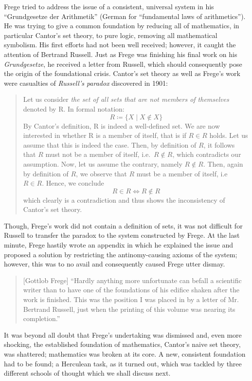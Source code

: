 \documentclass[hidelinks]{article}
\theoremstyle{plain}
\theoremstyle{definition}
\theoremstyle{rem}
\begin{document}
Frege tried to address the issue of a consistent, universal system in his ``Grundgesetze der Arithmetik'' (German for ``fundamental laws of arithmetics''). He was trying to give a common foundation by reducing all of mathematics, in particular Cantor's set theory, to pure logic, removing all mathematical symbolism. His first efforts had not been well received; however, it caught the attention of Bertrand Russell. Just as Frege was finishing his final work on his \textit{Grundgesetze}, he received a letter from Russell, which should consequently pose the origin of the foundational crisis. Cantor's set theory as well as Frege's work were casualties of \textit{Russell's paradox} discovered in 1901:
\begin{quote}
Let us consider \textit{the set of all sets that are not members of themselves} denoted by R. In formal notation:
\begin{equation*}
	R\coloneqq\{X\mid X\notin X\}
\end{equation*}
By Cantor's definition, R is indeed a well-defined set.
We are now interested in whether R is a member of itself, that is if $R\in R$ holds.
Let us assume that this is indeed the case. Then, by definition of $R$, it follows that $R$ must not be a member of itself, i.e.\ $R\notin R$, which contradicts our assumption. Now, let us assume the contrary, namely $R\notin R$. Then, again by definition of $R$, we observe that $R$ must be a member of itself, i.e\ $R\in R$. Hence, we conclude
\begin{equation*}
		R\in R\iff R\notin R
\end{equation*}
which clearly is a contradiction and thus shows the inconsistency of Cantor's set theory.
\end{quote}
Though, Frege's work did not contain a definition of sets, it was not difficult for Russell to transfer the paradox to the system constructed by Frege. At the last minute, Frege hastily wrote an appendix in which he explained the issue and proposed a solution by restricting the antinomy-causing axioms of the system; however, this was to no avail and consequently caused Frege utter dismay.
\begin{quote}[Gottlob Frege]
``Hardly anything more unfortunate can befall a scientific writer than to have one of the foundations of his edifice shaken after the work is finished. This was the position I was placed in by a letter of Mr. Bertrand Russell, just when the printing of this volume was nearing its completion.''\cite{frege_appendix}
\end{quote}
It was beyond all doubt that Frege's undertaking was dismissed and, even more shocking, the established foundation of mathematics, Cantor's naive set theory, was shattered; mathematics was broken at its core. A new, consistent foundation had to be found; a Herculean task, as it turned out, which was tackled by three different schools of thought which we shall discuss next.
\end{document}
